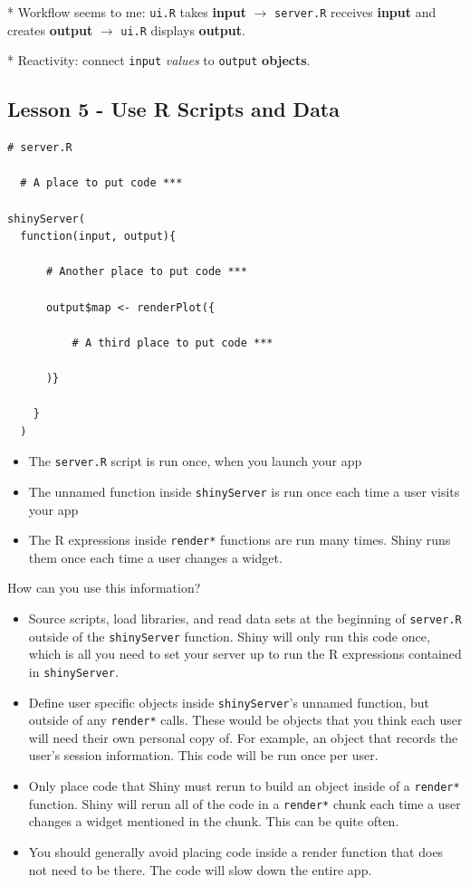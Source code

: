 \documentclass{article}
\begin{document}
* Workflow seems to me: \verb|ui.R| takes {\bf input} $\longrightarrow$ \verb|server.R| receives {\bf input} and creates {\bf output} $\longrightarrow$ \verb|ui.R| displays {\bf output}.

* Reactivity: connect \verb|input| {\it values} to \verb|output| {\bf objects}.

\subsection*{Lesson 5 - Use R Scripts and Data}
\begin{verbatim}
# server.R

  # A place to put code ***

shinyServer(
  function(input, output){
    
      # Another place to put code ***
    
      output$map <- renderPlot({
    
          # A third place to put code ***
          
      )}
      
    }
  )
\end{verbatim}
\begin{itemize}
\item The \verb|server.R| script is run once, when you launch your app
\item The unnamed function inside \verb|shinyServer| is run once each time a user visits your app
\item The R expressions inside \verb|render*| functions are run many times. Shiny runs them once each time a user changes a widget.
\end{itemize}
How can you use this information?
\begin{itemize}
\item Source scripts, load libraries, and read data sets at the beginning of \verb|server.R| outside of the \verb|shinyServer| function. Shiny will only run this code once, which is all you need to set your server up to run the R expressions contained in \verb|shinyServer|.

\item Define user specific objects inside \verb|shinyServer|’s unnamed function, but outside of any \verb|render*| calls. These would be objects that you think each user will need their own personal copy of. For example, an object that records the user’s session information. This code will be run once per user.

\item Only place code that Shiny must rerun to build an object inside of a \verb|render*| function. Shiny will rerun all of the code in a \verb|render*| chunk each time a user changes a widget mentioned in the chunk. This can be quite often.

\item You should generally avoid placing code inside a render function that does not need to be there. The code will slow down the entire app.
\end{itemize}
\end{document}
